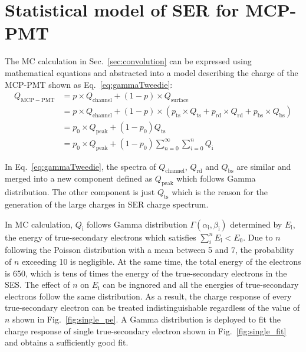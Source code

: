 \section{Statistical model of SER for MCP-PMT}\label{sec:model}
The MC calculation in Sec.~\ref{sec:convolution} can be expressed using mathematical equations
and abstracted into a model describing the charge of the MCP-PMT shown as Eq.~\eqref{eq:gammaTweedie}:
\begin{equation}
    \label{eq:gammaTweedie}
    \begin{aligned}
        Q_{\mathrm{MCP-PMT}} & = p\times Q_{\mathrm{channel}} + (1-p)\times Q_{\mathrm{surface}}                      \\
                             & = p\times Q_{\mathrm{channel}}+(1-p)\times (p_{\mathrm{ts}}
        \times Q_{\mathrm{ts}}+p_{\mathrm{rd}}\times Q_{\mathrm{rd}}+p_{\mathrm{bs}}\times Q_{\mathrm{bs}})           \\
                             & = p_0\times Q_{\mathrm{peak}} + (1-p_0)Q_{\mathrm{ts}}                                 \\
                             & = p_0\times Q_{\mathrm{peak}} + (1-p_0)\sum_{n=0}^{\infty}\sum_{i=0}^{n}Q_{\mathrm{i}}
    \end{aligned}
\end{equation}

In Eq.~\eqref{eq:gammaTweedie}, the spectra of $Q_{\mathrm{channel}}$, $Q_{\mathrm{rd}}$ and $Q_{\mathrm{bs}}$ are similar and
merged into a new component defined as $Q_{\mathrm{peak}}$ which follows Gamma distribution.
The other component is just $Q_{\mathrm{ts}}$ which is the reason
for the generation of the large charges in SER charge spectrum.

In MC calculation, $Q_{\mathrm{i}}$ follows Gamma distribution $\varGamma(\alpha_{\mathrm{i}},\beta_{\mathrm{i}})$ determined by $E_{\mathrm{i}}$,
the energy of true-secondary electrons which satisfies $\sum_i^nE_{\mathrm{i}}<E_0$.
Due to $n$ following the Poisson distribution with a mean between 5 and 7,
the probability of $n$ exceeding 10 is negligible.
At the same time, the total energy of the electrons is 650,
which is tens of times the energy of the true-secondary electrons in the SES.
The effect of $n$ on $E_{\mathrm{i}}$ can be ingnored
and all the energies of true-secondary electrons follow the same distribution.
As a result, the charge response of every true-secondary electron
can be treated indistinguishable regardless of the value of $n$ shown in Fig.~\ref{fig:single_pe}.
A Gamma distribution is deployed to fit the charge response of single true-secondary electron
shown in Fig.~\ref{fig:single_fit} and obtains a sufficiently good fit.

